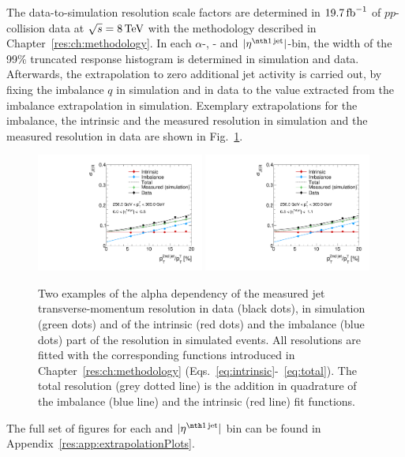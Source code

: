 The data-to-simulation resolution scale factors \rhores are determined in $19.7\,\text{fb}^{-1}$ of $pp$-collision data at $\sqrt{s} = 8 \,\text{Te}\kern-0.06667em\text{V}$ with the methodology described in Chapter~\ref{res:ch:methodology}.
In each $\alpha$-, \ptgamma- and $|\etafirstjet|$-bin, the width of the 99\% truncated response histogram is determined in simulation and data.
Afterwards, the extrapolation to zero additional jet activity is carried out, by fixing the imbalance $q$ in simulation and in data to the value extracted from the imbalance extrapolation in simulation.
Exemplary extrapolations for the imbalance, the intrinsic and the measured resolution in simulation and the measured resolution in data are shown in Fig.~\ref{res:fig:ExtrapolationsWithData}.
\begin{figure}[!t]
 \centering
    \includegraphics[width=0.49\textwidth]{figures/resolution/results/JER_for_1_eta_bin_10_pTGamma_bin_all_contributions_PFCHS_RMS99_mc.pdf}
    \includegraphics[width=0.49\textwidth]{figures/resolution/results/JER_for_2_eta_bin_10_pTGamma_bin_all_contributions_PFCHS_RMS99_mc.pdf}
  \caption{Two examples of the alpha dependency of the measured jet transverse-momentum resolution in data (black dots), in simulation (green dots) and  of the intrinsic (red dots) and the imbalance (blue dots) part 
           of the resolution in simulated events. All resolutions are fitted with the corresponding functions introduced in Chapter~\ref{res:ch:methodology} (Eqs.~\eqref{eq:intrinsic}-~\eqref{eq:total}).
           The total resolution (grey dotted line) is the addition in quadrature of the imbalance (blue line) and the intrinsic (red line) fit functions. }
  \label{res:fig:ExtrapolationsWithData}
\end{figure}
The full set of figures for each \ptgamma and $|\etafirstjet|$ bin can be found in Appendix~\ref{res:app:extrapolationPlots}.

